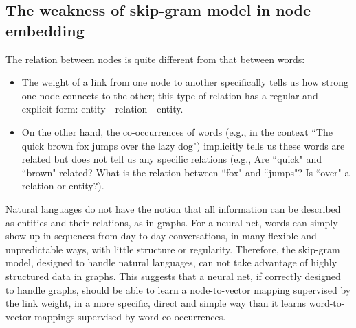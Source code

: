 \documentclass[12pt]{WSUThesis}
\theoremstyle{definition}
\begin{document}
\subsection{The weakness of skip-gram model in node embedding}
The relation between nodes is quite different from that between words:
\begin{itemize}
	\item The weight of a link from one node to another specifically tells us
	how strong one node connects to the other;
	this type of relation has a regular and explicit form:
	entity - relation - entity.
	\item On the other hand, the co-occurrences of words 
	(e.g., in the context ``The quick brown fox jumps over the lazy dog")
	implicitly tells us these words are related
	but does not tell us any specific relations
	(e.g., Are ``quick" and ``brown" related? What is the relation between ``fox" and ``jumps"? Is ``over" a relation or entity?).
\end{itemize}
Natural languages do not have the notion that
all information can be described as entities and their relations, as in graphs.
For a neural net, 
words can simply show up in sequences from day-to-day conversations,
in many flexible and unpredictable ways, with little structure or regularity.
Therefore, the skip-gram model, designed to handle natural languages,
can not take advantage of highly structured data in graphs.
This suggests that a neural net, if correctly designed to handle graphs,
should be able to learn a node-to-vector mapping supervised by the link weight,
in a more specific, direct and simple way than it learns word-to-vector 
mappings supervised by word co-occurrences.
\end{document}
